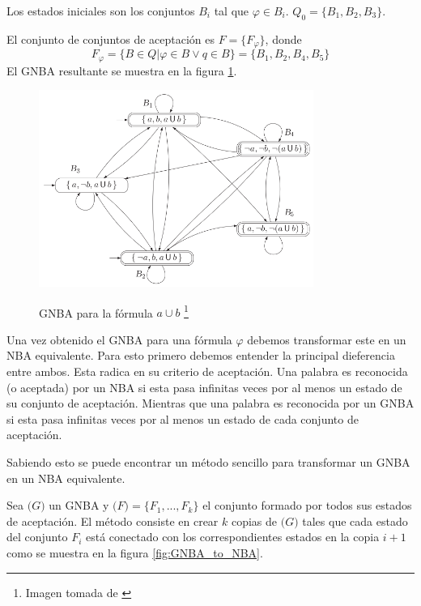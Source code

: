 Los estados iniciales son los conjuntos $B_i$ tal que $\varphi \in B_i$. $Q_0 = \{ B_1, B_2, B_3 \}$.

El conjunto de conjuntos de aceptación es $F = \{ F_\varphi \}$, donde
\[ F_\varphi = \{ B \in Q | \varphi \in B \vee q \in B \} = \{ B_1, B_2, B_4, B_5 \} \]
El GNBA resultante se muestra en la figura \ref{fig:GNBA_formula}.
\begin{figure}[hbtp]
\begin{minipage}{\textwidth}
\begin{center}
\caption[GNBA para la fórmula $ a \cup b $]%
{GNBA para la fórmula $ a \cup b $ \footnote[1]{Imagen tomada de \cite{katoen}}}
\includegraphics[width=0.8\textwidth]{ltl/imagenes/figura5_22.png}
\label{fig:GNBA_formula}
\end{center}
\end{minipage}
\end{figure}



Una vez obtenido el GNBA para una fórmula $\varphi$ debemos transformar este en un NBA equivalente.
Para esto primero debemos entender la principal dieferencia entre ambos.
Esta radica en su criterio de aceptación. Una palabra es reconocida (o aceptada) por un NBA si esta
pasa infinitas veces por al menos un estado de su conjunto de aceptación. Mientras que una palabra
es reconocida por un GNBA si esta pasa infinitas veces por al menos un estado de cada conjunto de
 aceptación.

Sabiendo esto se puede encontrar un método sencillo para transformar un GNBA en un NBA equivalente.

Sea $\mathcal(G)$ un GNBA y $\mathcal(F) = \{ F_1 , ..., F_k \} $ el conjunto formado por todos sus
 estados de aceptación.
El método consiste en crear $k$ copias de $\mathcal(G)$ tales que cada estado del conjunto $F_i$ está
 conectado con los correspondientes estados en la copia $i + 1$ como se muestra en la
 figura \ref{fig:GNBA_to_NBA}.

